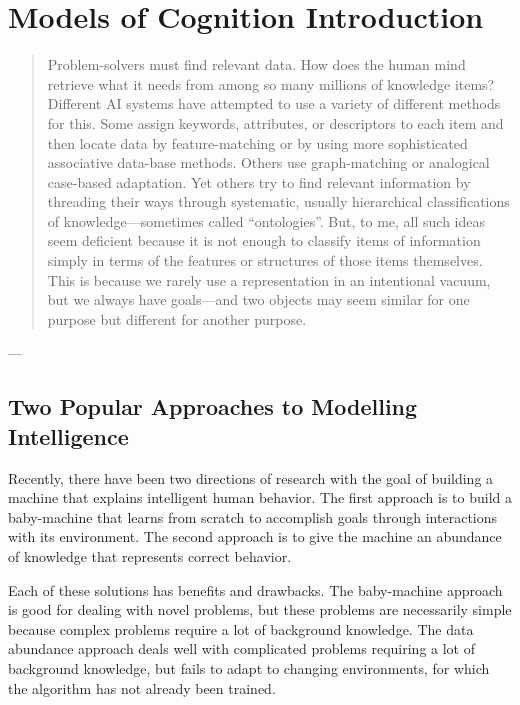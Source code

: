 \chapter{Models of Cognition Introduction}\label{ch:models_of_cognition_introduction}

\begin{quote}
Problem-solvers must find relevant data.  How does the human mind
retrieve what it needs from among so many millions of knowledge items?
Different AI systems have attempted to use a variety of different
methods for this.  Some assign keywords, attributes, or descriptors to
each item and then locate data by feature-matching or by using more
sophisticated associative data-base methods.  Others use
graph-matching or analogical case-based adaptation.  Yet others try to
find relevant information by threading their ways through systematic,
usually hierarchical classifications of knowledge---sometimes called
``ontologies''.  But, to me, all such ideas seem deficient because it
is not enough to classify items of information simply in terms of the
features or structures of those items themselves.  This is because we
rarely use a representation in an intentional vacuum, but we always
have goals---and two objects may seem similar for one purpose but
different for another purpose.
\end{quote}
\begin{flushright}
 ---  \citep{minsky:1991}
\end{flushright}

\section{Two Popular Approaches to Modelling Intelligence}

Recently, there have been two directions of research with the goal of
building a machine that explains intelligent human behavior.  The
first approach is to build a baby-machine that learns from scratch to
accomplish goals through interactions with its environment.  The
second approach is to give the machine an abundance of knowledge that
represents correct behavior.

Each of these solutions has benefits and drawbacks.  The baby-machine
approach is good for dealing with novel problems, but these problems
are necessarily simple because complex problems require a lot of
background knowledge.  The data abundance approach deals well with
complicated problems requiring a lot of background knowledge, but
fails to adapt to changing environments, for which the algorithm has
not already been trained.

